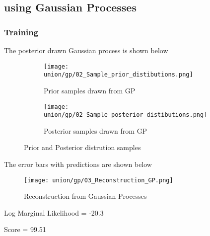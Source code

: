 \subsection{using Gaussian Processes}
\label{071_union_gp}
\subsubsection{Training}
The posterior drawn Gaussian process is shown below

\begin{figure}[H]
	\centering
	\begin{subfigure}[t]{0.5\textwidth}
		\centering
		\texttt{[image: union/gp/02\_Sample\_prior\_distibutions.png]}
		\caption{Prior samples drawn from GP}
		\label{fig:prior_pantheon}
	\end{subfigure}%
	\begin{subfigure}[t]{0.5\textwidth}
		\centering
		\texttt{[image: union/gp/02\_Sample\_posterior\_distibutions.png]}
		\caption{Posterior samples drawn from GP}
		\label{fig:posterior_pantheon}
	\end{subfigure}
	\caption{Prior and Posterior distrution samples}
	\label{prior_posterior_pantheon_gp}
\end{figure}

The error bars with predictions are shown below
\begin{figure}[H]
	\centering
	\texttt{[image: union/gp/03\_Reconstruction\_GP.png]}
	\caption{Reconstruction from Gaussian Processes}
	\label{fig:gp_re_union}
\end{figure}

Log Marginal Likelihood = -20.3

Score = 99.51
